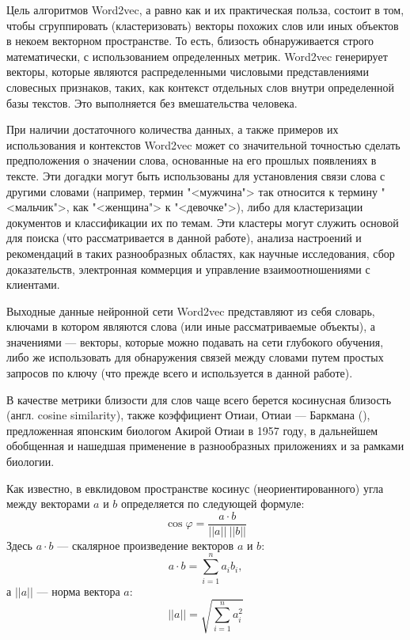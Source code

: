 Цель алгоритмов Word2vec, а равно как и их практическая польза, состоит в том, чтобы сгруппировать (кластеризовать) векторы похожих
слов или иных объектов в некоем векторном пространстве. То есть, близость обнаруживается строго математически, с использованием
определенных метрик. Word2vec генерирует векторы, которые являются распределенными числовыми представлениями словесных признаков,
таких, как контекст отдельных слов внутри определенной базы текстов. Это выполняется без вмешательства человека.

При наличии достаточного количества данных, а также примеров их использования и контекстов Word2vec может со значительной точностью
сделать предположения о значении слова, основанные на его прошлых появлениях в тексте. Эти догадки могут быть использованы для
установления связи слова с другими словами (например, термин "<мужчина"> так относится к термину "<мальчик">, как "<женщина">
к "<девочке">), либо для кластеризации документов и классификации их по темам. Эти кластеры могут служить основой для поиска (что
рассматривается в данной работе), анализа настроений и рекомендаций в таких разнообразных областях, как научные исследования,
сбор доказательств, электронная коммерция и управление взаимоотношениями с клиентами.

Выходные данные нейронной сети Word2vec представляют из себя словарь, ключами в котором являются слова (или иные рассматриваемые объекты),
а значениями --- векторы, которые можно подавать на сети глубокого обучения, либо же использовать для обнаружения связей между словами
путем простых запросов по ключу (что прежде всего и используется в данной работе).

В качестве метрики близости для слов чаще всего берется косинусная близость (англ. cosine similarity), также коэффициент
Отиаи, Отиаи --- Баркмана (\cite{10.2307/1302424,barkman1969phytosociology,Ochiai1957ZoogeographicalSO}), предложенная японским биологом
Акирой Отиаи в 1957 году, в дальнейшем обобщенная и нашедшая применение в разнообразных приложениях и за рамками биологии.

Как известно, в евклидовом пространстве косинус (неориентированного) угла между векторами $a$ и $b$ определяется по следующей формуле:
\begin{equation}
    \cos\varphi = \frac{a\cdot b}{||a||\ ||b||}
\end{equation}
Здесь $a\cdot b$ --- скалярное произведение векторов $a$ и $b$:
\begin{equation}
    a\cdot b = \sum\limits_{i=1}^n a_i b_i,
\end{equation}
а $||a||$ --- норма вектора $a$:
\begin{equation}
    ||a||=\sqrt{\sum\limits_{i=1}^n a_i^2}
\end{equation}


